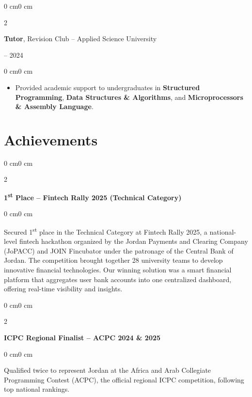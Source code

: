 \documentclass[10pt, letterpaper]{article}
\newenvironment{highlights}{
    \begin{itemize}[
        topsep=0.10 cm,
        parsep=0.10 cm,
        partopsep=0pt,
        itemsep=0pt,
        leftmargin=0 cm + 10pt
    ]
}{
    \end{itemize}
}
\newenvironment{onecolentry}{
    \begin{adjustwidth}{0 cm}{0 cm}
}{
    \end{adjustwidth}
}
\newenvironment{twocolentry}[2][]{
    \onecolentry
    \def\secondColumn{#2}
    \setcolumnwidth{\fill, 4.5 cm}
    \begin{paracol}{2}
}{
    \switchcolumn \raggedleft \secondColumn
    \end{paracol}
    \endonecolentry
}
\begin{document}
        \vspace{0.2 cm}

        \begin{twocolentry}{
            2023 -- 2024
        }
            \textbf{Tutor}, Revision Club -- Applied Science University
        \end{twocolentry}
        
        \vspace{0.10 cm}
        \begin{onecolentry}
            \begin{highlights}
                \item Provided academic support to undergraduates in \textbf{Structured Programming}, \textbf{Data Structures \& Algorithms}, and \textbf{Microprocessors \& Assembly Language}.
            \end{highlights}
        \end{onecolentry}

        \section{Achievements}
        \vspace{0.2 cm}
        
        \begin{twocolentry}{}
            \textbf{1\textsuperscript{st} Place -- Fintech Rally 2025 (Technical Category)}
        \end{twocolentry}
        \begin{onecolentry}
            Secured 1\textsuperscript{st} place in the Technical Category at Fintech Rally 2025, a national-level fintech hackathon organized by the Jordan Payments and Clearing Company (JoPACC) and JOIN Fincubator under the patronage of the Central Bank of Jordan. The competition brought together 28 university teams to develop innovative financial technologies. Our winning solution was a smart financial platform that aggregates user bank accounts into one centralized dashboard, offering real-time visibility and insights.
        \end{onecolentry}
        
        \vspace{0.2 cm}
        
        \begin{twocolentry}{}
            \textbf{ICPC Regional Finalist -- ACPC 2024 \& 2025}
        \end{twocolentry}
        \begin{onecolentry}
            Qualified twice to represent Jordan at the Africa and Arab Collegiate Programming Contest (ACPC), the official regional ICPC competition, following top national rankings.
        \end{onecolentry}
        
\end{document}
